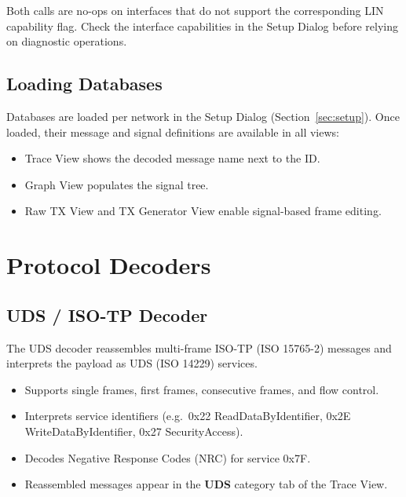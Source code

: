 \documentclass[a4paper,11pt]{article}
\newcommand{\ui}[1]{\textbf{#1}}
\begin{document}
\begin{notebox}
Both calls are no-ops on interfaces that do not support the corresponding
LIN capability flag. Check the interface capabilities in the Setup Dialog
before relying on diagnostic operations.
\end{notebox}

\subsection{Loading Databases}

Databases are loaded per network in the Setup Dialog (Section~\ref{sec:setup}).
Once loaded, their message and signal definitions are available in all views:

\begin{itemize}
  \item Trace View shows the decoded message name next to the ID.
  \item Graph View populates the signal tree.
  \item Raw TX View and TX Generator View enable signal-based frame editing.
\end{itemize}

\section{Protocol Decoders}

\subsection{UDS / ISO-TP Decoder}

The UDS decoder reassembles multi-frame ISO-TP (ISO 15765-2) messages and
interprets the payload as UDS (ISO 14229) services.

\begin{itemize}
  \item Supports single frames, first frames, consecutive frames, and flow control.
  \item Interprets service identifiers (e.g.\ 0x22 ReadDataByIdentifier,
        0x2E WriteDataByIdentifier, 0x27 SecurityAccess).
  \item Decodes Negative Response Codes (NRC) for service 0x7F.
  \item Reassembled messages appear in the \ui{UDS} category tab of the Trace View.
\end{itemize}
\end{document}
